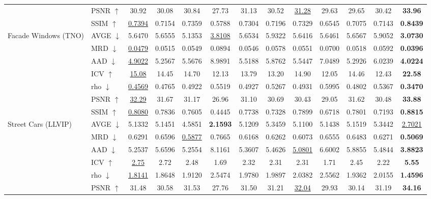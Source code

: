 \begin{table}[t]
{\begin{tabular}{llccccccccccc}
 & PSNR $\uparrow$ & 30.92 & 30.08 & 30.84 & 27.73 & 31.13 & 30.52 & \underline{31.28} & 29.63 & 29.65 & 30.42 & \textbf{33.96} \\
 & SSIM $\uparrow$ & \underline{0.7394} & 0.7154 & 0.7359 & 0.5788 & 0.7304 & 0.7196 & 0.7329 & 0.6545 & 0.7075 & 0.7143 & \textbf{0.8439} \\
\midrule
\multirow{7}{*}{Facade Windows (TNO)} & AVGE $\downarrow$ & 5.6470 & 5.6555 & 5.1353 & \underline{3.8108} & 5.6534 & 5.9322 & 5.6416 & 5.6461 & 5.6567 & 5.9052 & \textbf{3.0730} \\
 & MRD $\downarrow$ & \underline{0.0479} & 0.0515 & 0.0549 & 0.0894 & 0.0546 & 0.0578 & 0.0551 & 0.0700 & 0.0518 & 0.0592 & \textbf{0.0396} \\
 & AAD $\downarrow$ & \underline{4.9022} & 5.2567 & 5.5676 & 8.9891 & 5.5188 & 5.8762 & 5.5447 & 7.0489 & 5.2926 & 6.0239 & \textbf{4.0224} \\
 & ICV $\uparrow$ & \underline{15.08} & 14.45 & 14.70 & 12.13 & 13.79 & 13.20 & 14.90 & 12.05 & 14.46 & 12.43 & \textbf{22.58} \\
 & rho $\downarrow$ & \underline{0.4569} & 0.4765 & 0.4922 & 0.5519 & 0.4927 & 0.5267 & 0.4931 & 0.5995 & 0.4802 & 0.5367 & \textbf{0.3470} \\
 & PSNR $\uparrow$ & \underline{32.29} & 31.67 & 31.17 & 26.96 & 31.10 & 30.69 & 30.43 & 29.05 & 31.62 & 30.48 & \textbf{33.88} \\
 & SSIM $\uparrow$ & \underline{0.8080} & 0.7836 & 0.7605 & 0.4445 & 0.7738 & 0.7328 & 0.7899 & 0.6718 & 0.7801 & 0.7193 & \textbf{0.8815} \\
\midrule
\multirow{7}{*}{Street Cars (LLVIP)} & AVGE $\downarrow$ & 5.1332 & 5.1451 & 4.5851 & \textbf{2.1593} & 5.1209 & 5.3459 & 5.1100 & 5.1438 & 5.1519 & 5.3442 & \underline{2.7021} \\
 & MRD $\downarrow$ & 0.6291 & 0.6596 & \underline{0.5877} & 0.7665 & 0.6168 & 0.6262 & 0.6073 & 0.6555 & 0.6483 & 0.6271 & \textbf{0.5069} \\
 & AAD $\downarrow$ & 5.2537 & 5.6596 & 5.2554 & 8.1161 & 5.3607 & 5.4626 & \underline{5.0801} & 6.6002 & 5.8855 & 5.4844 & \textbf{3.8823} \\
 & ICV $\uparrow$ & \underline{2.75} & 2.72 & 2.48 & 1.69 & 2.32 & 2.31 & 2.31 & 1.71 & 2.45 & 2.22 & \textbf{5.55} \\
 & rho $\downarrow$ & \underline{1.8141} & 1.8648 & 1.9120 & 2.5474 & 1.9780 & 1.9897 & 2.0382 & 2.5562 & 1.9362 & 2.0155 & \textbf{1.4596} \\
 & PSNR $\uparrow$ & 31.48 & 30.58 & 31.53 & 27.76 & 31.50 & 31.21 & \underline{32.04} & 29.93 & 30.14 & 31.19 & \textbf{34.16} \\

\end{tabular}}
\end{table}

